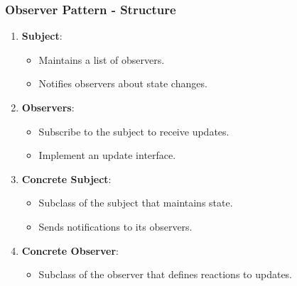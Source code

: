 \documentclass{beamer}
\begin{document}
\begin{frame}[fragile]
    \frametitle{Observer Pattern - Structure}
    \begin{enumerate}
        \item \textbf{Subject}:
            \begin{itemize}
                \item Maintains a list of observers.
                \item Notifies observers about state changes.
            \end{itemize}
        \item \textbf{Observers}:
            \begin{itemize}
                \item Subscribe to the subject to receive updates.
                \item Implement an update interface.
            \end{itemize}
        \item \textbf{Concrete Subject}:
            \begin{itemize}
                \item Subclass of the subject that maintains state.
                \item Sends notifications to its observers.
            \end{itemize}
        \item \textbf{Concrete Observer}:
            \begin{itemize}
                \item Subclass of the observer that defines reactions to updates.
            \end{itemize}
    \end{enumerate}
\end{frame}
\end{document}
